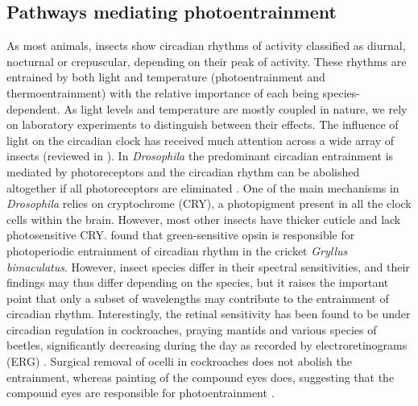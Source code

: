 \subsection{Pathways mediating photoentrainment}
As most animals, insects show circadian rhythms of activity classified as diurnal, nocturnal or crepuscular, depending on their peak of activity. These rhythms are entrained by both light and temperature (photoentrainment and thermoentrainment) with the relative importance of each being species-dependent. As light levels and temperature are mostly coupled in nature, we rely on laboratory experiments to distinguish between their effects. The influence of light on the circadian clock has received much attention across a wide array of insects (reviewed in \citealt{Helfrich-Forster2020}). In \textit{Drosophila} the predominant circadian entrainment is mediated by photoreceptors and the circadian rhythm can be abolished altogether if all photoreceptors are eliminated \citep{Helfrich-Forster2001}. 
One of the main mechanisms in \textit{Drosophila} relies on cryptochrome (CRY), a photopigment present in all the clock cells within the brain. However, most other insects have thicker cuticle and lack photosensitive CRY. 
\cite{Komada2015} found that green-sensitive opsin is responsible for photoperiodic entrainment of circadian rhythm in the cricket \textit{Gryllus bimaculatus}. However, insect species differ in their spectral sensitivities, and their findings may thus differ depending on the species, but it raises the important point that only a subset of wavelengths may contribute to the entrainment of circadian rhythm.
Interestingly, the retinal sensitivity has been found to be under circadian regulation in cockroaches, praying mantids and various species of beetles, significantly decreasing during the day as recorded by electroretinograms (ERG) \citep{Wills1985,Schirmer2014,Fleissner1982,Koehler1978}. Surgical removal of ocelli in cockroaches does not abolish the entrainment, whereas painting of the compound eyes does, suggesting that the compound eyes are responsible for photoentrainment \citep{Roberts1965}.

